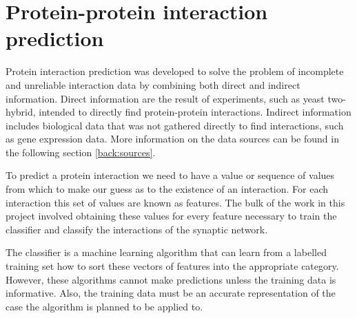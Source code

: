 
\section{Protein-protein interaction prediction}

Protein interaction prediction was developed to solve the problem of incomplete and unreliable interaction data by combining both direct and indirect information\autocite{qi_learning_2008}.
Direct information are the result of experiments, such as yeast two-hybrid, intended to directly find protein-protein interactions.  %
Indirect information includes biological data that was not gathered directly to find interactions, such as gene expression data. %
More information on the data sources can be found in the following section \ref{back:sources}.


To predict a protein interaction we need to have a value or sequence of values from which to make our guess as to the existence of an interaction.
For each interaction this set of values are known as features.
The bulk of the work in this project involved obtaining these values for every feature necessary to train the classifier and classify the interactions of the synaptic network.  %

The classifier is a machine learning algorithm that can learn from a labelled training set how to sort these vectors of features into the appropriate category. %
However, these algorithms cannot make predictions unless the training data is informative.   
Also, the training data must be an accurate representation of the case the algorithm is planned to be applied to. %

